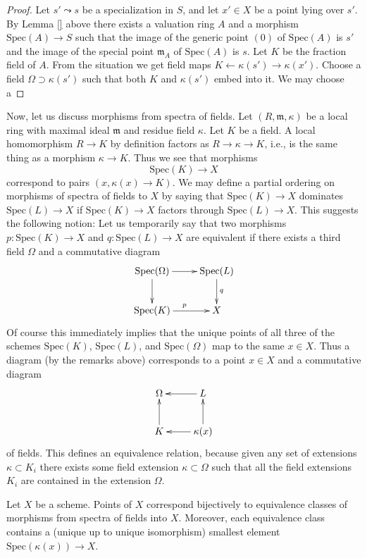 \begin{proof}
Let $s' \leadsto s$ be a specialization in $S$, and let
$x' \in X$ be a point lying over $s'$. By Lemma \ref{} above
there exists a valuation ring $A$ and a morphism
$\text{Spec}(A) \to S$ such that the image of the
generic point $(0)$ of $\text{Spec}(A)$ is $s'$ and
the image of the special point $\mathfrak m_A$ of $\text{Spec}(A)$ is $s$.
Let $K$ be the fraction field of $A$. From the situation
we get field maps $K \leftarrow \kappa(s') \rightarrow \kappa(x')$.
Choose a field $\Omega \supset \kappa(s')$ such that both
$K$ and $\kappa(s')$ embed into it. We may choose a 





\end{proof}


\noindent
Now, let us discuss morphisms from spectra of fields.
Let $(R, \mathfrak m, \kappa)$ be a local ring
with maximal ideal $\mathfrak m$ and residue field $\kappa$.
Let $K$ be a field. A local homomorphism $R \to K$ by definition
factors as $R \to \kappa \to K$, i.e., is the same thing as
a morphism $\kappa \to K$. Thus we see that morphisms
$$
\text{Spec}(K) \longrightarrow X
$$
correspond to pairs $(x, \kappa(x) \to K)$. We may define
a partial ordering on morphisms of spectra of fields to $X$
by saying that $\text{Spec}(K) \to X$ dominates
$\text{Spec}(L) \to X$ if $\text{Spec}(K) \to X$
factors through $\text{Spec}(L) \to X$. This suggests
the following notion: Let us temporarily
say that two morphisms $p : \text{Spec}(K) \to X$ and
$q : \text{Spec}(L) \to X$ are equivalent if there exists
a third field $\Omega$ and a commutative diagram
$$
\xymatrix{
\text{Spec}(\Omega) \ar[r] \ar[d] &
\text{Spec}(L) \ar[d]^q \\
\text{Spec}(K) \ar[r]^p &
X
}
$$
Of course this immediately implies that the unique points of
all three of the schemes $\text{Spec}(K)$,
$\text{Spec}(L)$, and $\text{Spec}(\Omega)$
map to the same $x \in X$. Thus a diagram (by the remarks above)
corresponds to a point $x \in X$ and a commutative diagram
$$
\xymatrix{
\Omega &
L \ar[l] \\
K \ar[u] &
\kappa(x) \ar[l] \ar[u]
}
$$
of fields. This defines an equivalence relation, because given
any set of extensions $\kappa \subset K_i$ there exists
some field extension $\kappa \subset \Omega$ such that all
the field extensions $K_i$ are contained in the extension $\Omega$.

\begin{lemma}
\label{lemma-characterize-points}
Let $X$ be a scheme. Points of $X$ correspond bijectively
to equivalence classes of morphisms from spectra of
fields into $X$. Moreover, each equivalence class contains
a (unique up to unique isomorphism) smallest element
$\text{Spec}(\kappa(x)) \to X$.
\end{lemma}

